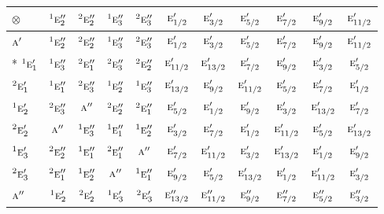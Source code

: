 \documentclass[10pt,a4paper]{article}
\numberwithin{equation}{section}
\newcommand{\irr}[1]{\text{\normalfont\scshape #1}}
\newcommand{\conjpair}[1]{{}^{#1}}
\newcommand{\irrprod}{\otimes}
\begin{document}
{\small\setlength{\tabcolsep}{3pt}\begin{longtable}{@{}lcccccccccc@{}}\toprule
$\irrprod$ & $\conjpair{1}\irr{e}_{2}''$ & $\conjpair{2}\irr{e}_{2}''$ & $\conjpair{1}\irr{e}_{3}''$ & $\conjpair{2}\irr{e}_{3}''$ & $\irr{e}_{1/2}'$ & $\irr{e}_{3/2}'$ & $\irr{e}_{5/2}'$ & $\irr{e}_{7/2}'$ & $\irr{e}_{9/2}'$ & $\irr{e}_{11/2}'$\\\midrule\endhead
\bottomrule\endfoot\endlastfoot
$\irr{a}'$ & $\conjpair{1}\irr{e}_{2}''$ & $\conjpair{2}\irr{e}_{2}''$ & $\conjpair{1}\irr{e}_{3}''$ & $\conjpair{2}\irr{e}_{3}''$ & $\irr{e}_{1/2}'$ & $\irr{e}_{3/2}'$ & $\irr{e}_{5/2}'$ & $\irr{e}_{7/2}'$ & $\irr{e}_{9/2}'$ & $\irr{e}_{11/2}'$\\*
$\conjpair{1}\irr{e}_{1}'$ & $\conjpair{1}\irr{e}_{3}''$ & $\conjpair{2}\irr{e}_{1}''$ & $\conjpair{2}\irr{e}_{3}''$ & $\conjpair{2}\irr{e}_{2}''$ & $\irr{e}_{11/2}'$ & $\irr{e}_{13/2}'$ & $\irr{e}_{7/2}'$ & $\irr{e}_{9/2}'$ & $\irr{e}_{3/2}'$ & $\irr{e}_{5/2}'$\\
$\conjpair{2}\irr{e}_{1}'$ & $\conjpair{1}\irr{e}_{1}''$ & $\conjpair{2}\irr{e}_{3}''$ & $\conjpair{1}\irr{e}_{2}''$ & $\conjpair{1}\irr{e}_{3}''$ & $\irr{e}_{13/2}'$ & $\irr{e}_{9/2}'$ & $\irr{e}_{11/2}'$ & $\irr{e}_{5/2}'$ & $\irr{e}_{7/2}'$ & $\irr{e}_{1/2}'$\\
$\conjpair{1}\irr{e}_{2}'$ & $\conjpair{2}\irr{e}_{3}''$ & $\irr{a}''$ & $\conjpair{2}\irr{e}_{2}''$ & $\conjpair{2}\irr{e}_{1}''$ & $\irr{e}_{5/2}'$ & $\irr{e}_{1/2}'$ & $\irr{e}_{9/2}'$ & $\irr{e}_{3/2}'$ & $\irr{e}_{13/2}'$ & $\irr{e}_{7/2}'$\\
$\conjpair{2}\irr{e}_{2}'$ & $\irr{a}''$ & $\conjpair{1}\irr{e}_{3}''$ & $\conjpair{1}\irr{e}_{1}''$ & $\conjpair{1}\irr{e}_{2}''$ & $\irr{e}_{3/2}'$ & $\irr{e}_{7/2}'$ & $\irr{e}_{1/2}'$ & $\irr{e}_{11/2}'$ & $\irr{e}_{5/2}'$ & $\irr{e}_{13/2}'$\\
$\conjpair{1}\irr{e}_{3}'$ & $\conjpair{2}\irr{e}_{2}''$ & $\conjpair{1}\irr{e}_{1}''$ & $\conjpair{2}\irr{e}_{1}''$ & $\irr{a}''$ & $\irr{e}_{7/2}'$ & $\irr{e}_{11/2}'$ & $\irr{e}_{3/2}'$ & $\irr{e}_{13/2}'$ & $\irr{e}_{1/2}'$ & $\irr{e}_{9/2}'$\\
$\conjpair{2}\irr{e}_{3}'$ & $\conjpair{2}\irr{e}_{1}''$ & $\conjpair{1}\irr{e}_{2}''$ & $\irr{a}''$ & $\conjpair{1}\irr{e}_{1}''$ & $\irr{e}_{9/2}'$ & $\irr{e}_{5/2}'$ & $\irr{e}_{13/2}'$ & $\irr{e}_{1/2}'$ & $\irr{e}_{11/2}'$ & $\irr{e}_{3/2}'$\\
$\irr{a}''$ & $\conjpair{1}\irr{e}_{2}'$ & $\conjpair{2}\irr{e}_{2}'$ & $\conjpair{1}\irr{e}_{3}'$ & $\conjpair{2}\irr{e}_{3}'$ & $\irr{e}_{13/2}''$ & $\irr{e}_{11/2}''$ & $\irr{e}_{9/2}''$ & $\irr{e}_{7/2}''$ & $\irr{e}_{5/2}''$ & $\irr{e}_{3/2}''$\\

\end{longtable}}
\end{document}
